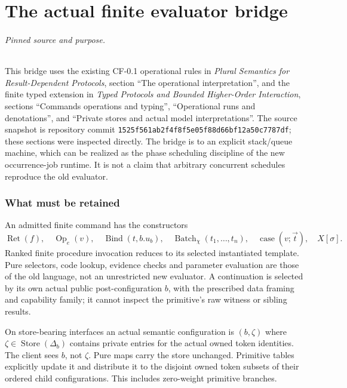 \documentclass[11pt]{article}
\begin{document}
\part{The actual finite evaluator bridge}

\paragraph{Pinned source and purpose.} This bridge uses the existing CF-0.1 operational rules in \emph{Plural Semantics for Result-Dependent Protocols}, section ``The operational interpretation'', and the finite typed extension in \emph{Typed Protocols and Bounded Higher-Order Interaction}, sections ``Commands operations and typing'', ``Operational runs and denotations'', and ``Private stores and actual model interpretations''. The source snapshot is repository commit \texttt{1525f561ab2f4f8f5e05f88d66bf12a50c7787df}; these sections were inspected directly. The bridge is to an explicit stack/queue machine, which can be realized as the phase scheduling discipline of the new occurrence-job runtime. It is not a claim that arbitrary concurrent schedules reproduce the old evaluator.

\section{What must be retained}
An admitted finite command has the constructors
\[
 \operatorname{Ret}(f),\quad\operatorname{Op}_e(v),\quad
 \operatorname{Bind}(t,b.u_b),\quad\operatorname{Batch}_\chi(t_1,\ldots,t_n),
 \quad\operatorname{case}(v;\vec t),\quad X[\sigma].
\]
Ranked finite procedure invocation reduces to its selected instantiated template. Pure selectors, code lookup, evidence checks and parameter evaluation are those of the old language, not an unrestricted new evaluator. A continuation is selected by its own actual public post-configuration $b$, with the prescribed data framing and capability family; it cannot inspect the primitive's raw witness or sibling results.

On store-bearing interfaces an actual semantic configuration is $(b,\zeta)$ where $\zeta\in\operatorname{Store}(\Delta_b)$ contains private entries for the actual owned token identities. The client sees $b$, not $\zeta$. Pure maps carry the store unchanged. Primitive tables explicitly update it and distribute it to the disjoint owned token subsets of their ordered child configurations. This includes zero-weight primitive branches.
\end{document}
